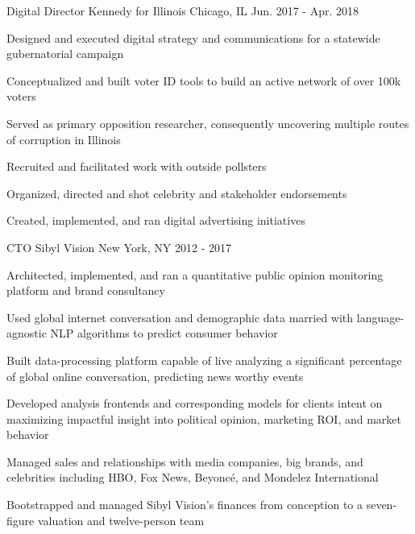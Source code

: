 \begin{cventries}
  \cventry
    {Digital Director} %
    {Kennedy for Illinois} %
    {Chicago, IL} %
    {Jun. 2017 - Apr. 2018} %
    {
      \begin{cvitems} %
	      \item {Designed and executed digital strategy and communications for a statewide gubernatorial campaign}
          \item {Conceptualized and built voter ID tools to build an active network of over 100k voters}
          \item {Served as primary opposition researcher, consequently uncovering multiple routes of corruption in Illinois}
          \item {Recruited and facilitated work with outside pollsters}
          \item {Organized, directed and shot celebrity and stakeholder endorsements}
          \item {Created, implemented, and ran digital advertising initiatives}
      \end{cvitems}
    }


  \cventry
    {CTO} %
    {Sibyl Vision} %
    {New York, NY} %
    {2012 - 2017} %
    {
      \begin{cvitems} %
      	\item {Architected, implemented, and ran a quantitative public opinion monitoring platform and brand consultancy}
        \item {Used global internet conversation and demographic data married with language-agnostic NLP algorithms to predict consumer behavior}
        \item {Built data-processing platform capable of live analyzing a significant percentage of global online conversation, predicting news worthy events}
        \item {Developed analysis frontends and corresponding models for clients intent on maximizing impactful insight into political opinion, marketing ROI, and market behavior}
    	\item {Managed sales and relationships with media companies, big brands, and celebrities including HBO, Fox News, Beyoncé, and Mondelez International}
        \item {Bootstrapped and managed Sibyl Vision's finances from conception to a seven-figure valuation and twelve-person team}
      \end{cvitems}
    }
    

\end{cventries}
